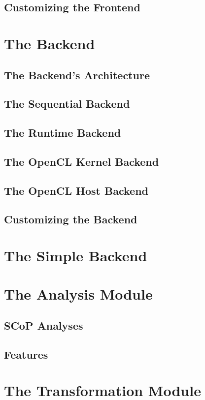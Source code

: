 \subsection{Customizing the Frontend}

\section{The Backend}
\subsection{The Backend's Architecture}
\subsection{The Sequential Backend}
\subsection{The Runtime Backend}
\subsection{The OpenCL Kernel Backend}
\subsection{The OpenCL Host Backend}
\subsection{Customizing the Backend}

\section{The Simple Backend}

\section{The Analysis Module}
\subsection{SCoP Analyses}
\subsection{Features}

\section{The Transformation Module}
